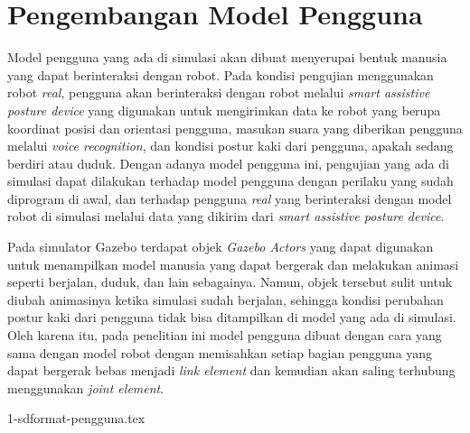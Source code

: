 \section{Pengembangan Model Pengguna}
\label{sec:modelpengguna}

Model pengguna yang ada di simulasi akan dibuat menyerupai bentuk manusia yang dapat berinteraksi dengan robot.
Pada kondisi pengujian menggunakan robot \emph{real},
  pengguna akan berinteraksi dengan robot melalui \emph{smart assistive posture device} yang digunakan untuk mengirimkan data ke robot yang berupa koordinat posisi dan orientasi pengguna,
  masukan suara yang diberikan pengguna melalui \emph{voice recognition},
  dan kondisi postur kaki dari pengguna, apakah sedang berdiri atau duduk.
Dengan adanya model pengguna ini,
  pengujian yang ada di simulasi dapat dilakukan terhadap model pengguna dengan perilaku yang sudah diprogram di awal,
  dan terhadap pengguna \emph{real} yang berinteraksi dengan model robot di simulasi melalui data yang dikirim dari \emph{smart assistive posture device}.

Pada simulator Gazebo terdapat objek \emph{Gazebo Actors} yang dapat digunakan untuk menampilkan model manusia yang dapat bergerak dan melakukan animasi seperti berjalan, duduk, dan lain sebagainya.
Namun, objek tersebut sulit untuk diubah animasinya ketika simulasi sudah berjalan,
  sehingga kondisi perubahan postur kaki dari pengguna tidak bisa ditampilkan di model yang ada di simulasi.
Oleh karena itu, pada penelitian ini model pengguna dibuat dengan cara yang sama dengan model robot dengan memisahkan setiap bagian pengguna yang dapat bergerak bebas menjadi \emph{link element} dan kemudian akan saling terhubung menggunakan \emph{joint element}.

{1-sdformat-pengguna.tex}

